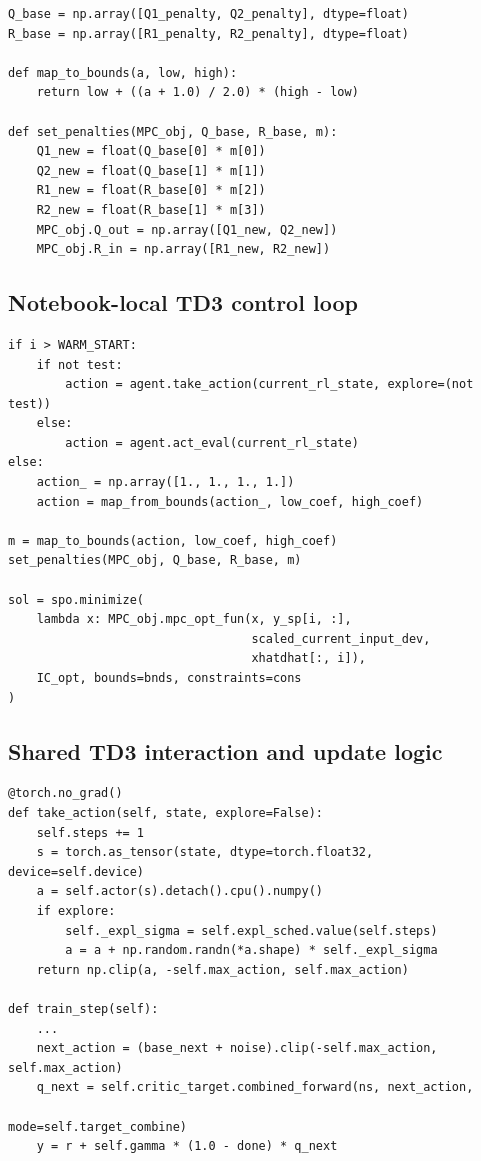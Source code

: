 \documentclass[11pt]{article}
\begin{document}
\begin{lstlisting}
Q_base = np.array([Q1_penalty, Q2_penalty], dtype=float)
R_base = np.array([R1_penalty, R2_penalty], dtype=float)

def map_to_bounds(a, low, high):
    return low + ((a + 1.0) / 2.0) * (high - low)

def set_penalties(MPC_obj, Q_base, R_base, m):
    Q1_new = float(Q_base[0] * m[0])
    Q2_new = float(Q_base[1] * m[1])
    R1_new = float(R_base[0] * m[2])
    R2_new = float(R_base[1] * m[3])
    MPC_obj.Q_out = np.array([Q1_new, Q2_new])
    MPC_obj.R_in = np.array([R1_new, R2_new])
\end{lstlisting}

\subsection*{Notebook-local TD3 control loop}

\begin{lstlisting}
if i > WARM_START:
    if not test:
        action = agent.take_action(current_rl_state, explore=(not test))
    else:
        action = agent.act_eval(current_rl_state)
else:
    action_ = np.array([1., 1., 1., 1.])
    action = map_from_bounds(action_, low_coef, high_coef)

m = map_to_bounds(action, low_coef, high_coef)
set_penalties(MPC_obj, Q_base, R_base, m)

sol = spo.minimize(
    lambda x: MPC_obj.mpc_opt_fun(x, y_sp[i, :],
                                  scaled_current_input_dev,
                                  xhatdhat[:, i]),
    IC_opt, bounds=bnds, constraints=cons
)
\end{lstlisting}

\subsection*{Shared TD3 interaction and update logic}

\begin{lstlisting}
@torch.no_grad()
def take_action(self, state, explore=False):
    self.steps += 1
    s = torch.as_tensor(state, dtype=torch.float32, device=self.device)
    a = self.actor(s).detach().cpu().numpy()
    if explore:
        self._expl_sigma = self.expl_sched.value(self.steps)
        a = a + np.random.randn(*a.shape) * self._expl_sigma
    return np.clip(a, -self.max_action, self.max_action)

def train_step(self):
    ...
    next_action = (base_next + noise).clip(-self.max_action, self.max_action)
    q_next = self.critic_target.combined_forward(ns, next_action,
                                                 mode=self.target_combine)
    y = r + self.gamma * (1.0 - done) * q_next
\end{lstlisting}
\end{document}
